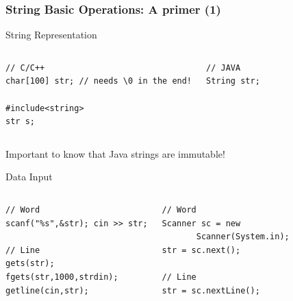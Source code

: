 \documentclass{beamer}
\begin{document}
\begin{frame}[fragile]
  \frametitle{String Basic Operations: A primer (1)}
  {\smaller
    \begin{block}{String Representation}
      \begin{columns}[T]
\begin{verbatim}
// C/C++
char[100] str; // needs \0 in the end!

#include<string> 
str s;
\end{verbatim}
\begin{verbatim}
// JAVA
String str;
\end{verbatim}
      \end{columns}
    \end{block}

Important to know that Java strings are immutable!
    
    \begin{block}{Data Input}
      \begin{columns}[T]
\begin{verbatim}
// Word
scanf("%s",&str); cin >> str;

// Line
gets(str); 
fgets(str,1000,strdin);
getline(cin,str);
\end{verbatim}
\begin{verbatim}
// Word
Scanner sc = new 
       Scanner(System.in);
str = sc.next();

// Line
str = sc.nextLine();
\end{verbatim}
      \end{columns}
    \end{block}
  }
\end{frame}
\end{document}

